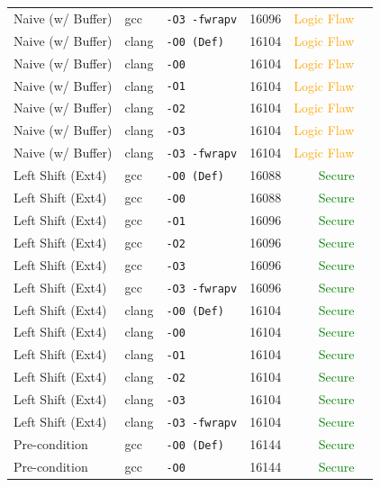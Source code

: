 \begin{table}[htbp]
\begin{tabular}{@{}lllcrl@{}}
Naive (w/ Buffer) & gcc & \texttt{-O3 -fwrapv} & 16096 & \textcolor{orange}{Logic Flaw} \\
Naive (w/ Buffer) & clang & \texttt{-O0 (Def)} & 16104 & \textcolor{orange}{Logic Flaw} \\
Naive (w/ Buffer) & clang & \texttt{-O0} & 16104 & \textcolor{orange}{Logic Flaw} \\
Naive (w/ Buffer) & clang & \texttt{-O1} & 16104 & \textcolor{orange}{Logic Flaw} \\
Naive (w/ Buffer) & clang & \texttt{-O2} & 16104 & \textcolor{orange}{Logic Flaw} \\
Naive (w/ Buffer) & clang & \texttt{-O3} & 16104 & \textcolor{orange}{Logic Flaw} \\
Naive (w/ Buffer) & clang & \texttt{-O3 -fwrapv} & 16104 & \textcolor{orange}{Logic Flaw} \\
\midrule
Left Shift (Ext4) & gcc & \texttt{-O0 (Def)} & 16088 & \textcolor{green}{Secure}} \\
Left Shift (Ext4) & gcc & \texttt{-O0} & 16088 & \textcolor{green}{Secure}} \\
Left Shift (Ext4) & gcc & \texttt{-O1} & 16096 & \textcolor{green}{Secure}} \\
Left Shift (Ext4) & gcc & \texttt{-O2} & 16096 & \textcolor{green}{Secure}} \\
Left Shift (Ext4) & gcc & \texttt{-O3} & 16096 & \textcolor{green}{Secure}} \\
Left Shift (Ext4) & gcc & \texttt{-O3 -fwrapv} & 16096 & \textcolor{green}{Secure}} \\
Left Shift (Ext4) & clang & \texttt{-O0 (Def)} & 16104 & \textcolor{green}{Secure}} \\
Left Shift (Ext4) & clang & \texttt{-O0} & 16104 & \textcolor{green}{Secure}} \\
Left Shift (Ext4) & clang & \texttt{-O1} & 16104 & \textcolor{green}{Secure}} \\
Left Shift (Ext4) & clang & \texttt{-O2} & 16104 & \textcolor{green}{Secure}} \\
Left Shift (Ext4) & clang & \texttt{-O3} & 16104 & \textcolor{green}{Secure}} \\
Left Shift (Ext4) & clang & \texttt{-O3 -fwrapv} & 16104 & \textcolor{green}{Secure}} \\
\midrule
Pre-condition & gcc & \texttt{-O0 (Def)} & 16144 & \textcolor{green}{Secure}} \\
Pre-condition & gcc & \texttt{-O0} & 16144 & \textcolor{green}{Secure}} \\

\end{tabular}
\end{table}
